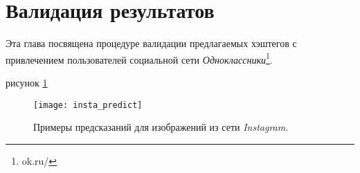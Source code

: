 \section{Валидация результатов}


\indent
\indent
Эта глава посвящена процедуре валидации предлагаемых 
хэштегов с привлечением пользователей социальной сети 
\textit{Одноклассники}\footnote{ok.ru/}.


рисунок \ref{tikzpicture: insta_predict}

\begin{figure}[h!]
    \begin{center}
   	    \texttt{[image: insta\_predict]}
   	\end{center}
   	\caption{Примеры предсказаний для изображений из сети \textit{Instagram}.}
   	\label{tikzpicture: insta_predict}
\end{figure}
